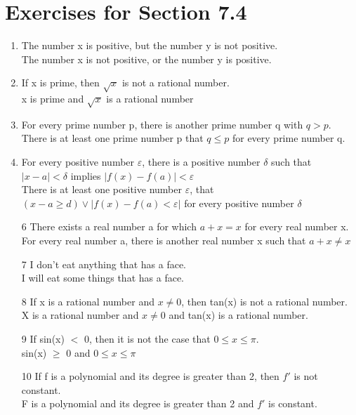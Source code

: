 \documentclass[12pt]{article}
\begin{document}
\section*{Exercises for Section 7.4}
\begin{enumerate}
	\item The number x is positive, but the number y is not positive.\\
	    The number x is not positive, or the number y is positive.
	\item If x is prime, then $\sqrt{x}$ is not a rational number.\\
	    x is prime and $\sqrt{x}$ is a rational number
	\item For every prime number p, there is another prime number q with $q>p$.\\
	    There is at least one prime number p that $q\le p$ for every prime number q.
	\item For every positive number $\varepsilon$, there is a positive number $\delta$ such that $|x-a| < \delta$ implies $|f(x) - f(a)| < \varepsilon$\\
	    There is at least one positive number $\varepsilon$, that $(x-a \ge d) \lor |f(x) - f(a) < \varepsilon|$ for every positive number $\delta$
	\item  [6] There exists a real number a for which $a+x=x$ for every real number x.\\
	    For every real number a, there is another real number x such that $a+x\ne x$
	\item  [7] I don't eat anything that has a face.\\
	    I will eat some things that has a face.
	\item  [8] If x is a rational number and $x \ne 0$, then tan(x) is not a rational number.\\
	    X is a rational number and $x\ne 0$ and tan(x) is a rational number.
	\item  [9] If sin(x) $<$ 0, then it is not the case that $0 \le x \le \pi$.\\
	    sin(x) $\ge$ 0 and $0 \le x \le \pi$
	\item  [10] If f is a polynomial and its degree is greater than 2, then $f'$ is not constant.\\
	    F is a polynomial and its degree is greater than 2 and $f'$ is constant.
\end{enumerate}
\end{document}
